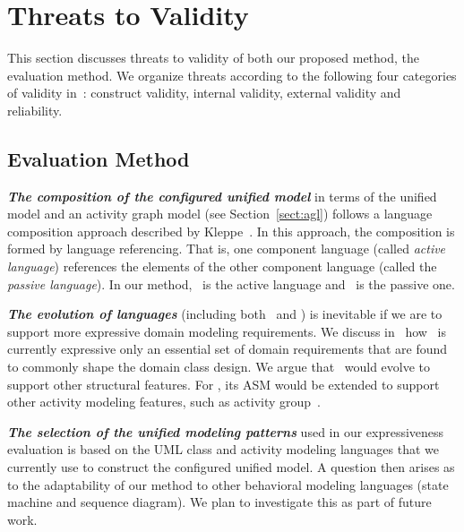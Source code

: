 \section{Threats to Validity} \label{sect:threats}
This section discusses threats to validity of both our proposed method, the evaluation method. We organize threats according to the following four categories of validity in~\cite{runeson2009guidelines}: construct validity, internal validity, external validity and reliability.

\subsection{Evaluation Method}
%

\textbf{\textit{The composition of the configured unified model}} in terms of the unified model and an activity graph model (see Section~\ref{sect:agl}) follows a language composition approach described by Kleppe~\cite{kleppe_software_2008}. In this approach, the composition is formed by language referencing. That is, one component language (called \textit{active language}) references the elements of the other component language (called the \textit{passive language}). In our method, \agl~is the active language and \dcsl~is the passive one.

\textbf{\textit{The evolution of languages}} (including both \agl~and \dcsl) is inevitable if we are to support 
more expressive domain modeling requirements. We discuss in~\cite{le_domain_2018} how \dcsl~is currently expressive only \wrt an essential set of domain requirements that are found to commonly shape the domain class design. We argue that \dcsl~would evolve to support other structural features. For \agl, its ASM would be extended to support other activity modeling features, such as activity group~\cite[p. 405]{omg_unified_2017}.

\textbf{\textit{The selection of the unified modeling patterns}} used in our expressiveness evaluation is based on the UML class and activity modeling languages that we currently use to construct the configured unified model. A question then arises as to the adaptability of our method to other behavioral modeling languages (\eg state machine and sequence diagram). We plan to investigate this as part of future work.
%
